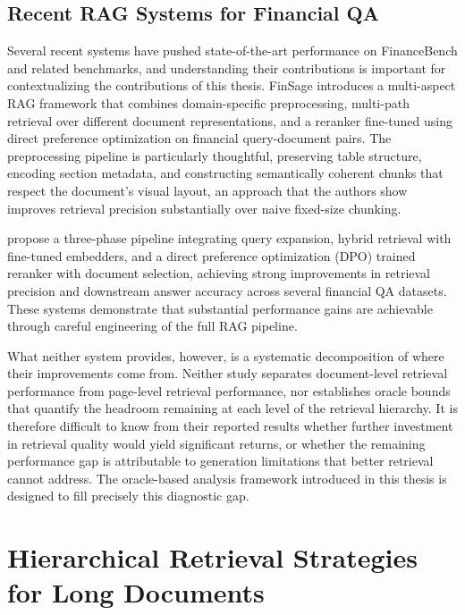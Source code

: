 \documentclass[12pt,twoside,maitrise]{dms}
\theoremstyle{definition}
\numberwithin{equation}{section}
\numberwithin{table}{chapter}
\numberwithin{figure}{chapter}
\begin{document}
\subsection{Recent RAG Systems for Financial QA}

Several recent systems have pushed state-of-the-art performance on FinanceBench and
related benchmarks, and understanding their contributions is important for contextualizing
the contributions of this thesis. FinSage \citep{wang2024finsage} introduces a
multi-aspect RAG framework that combines domain-specific preprocessing, multi-path
retrieval over different document representations, and a reranker fine-tuned using direct
preference optimization on financial query-document pairs. The preprocessing pipeline is
particularly thoughtful, preserving table structure, encoding section metadata, and
constructing semantically coherent chunks that respect the document's visual layout, an
approach that the authors show improves retrieval precision substantially over naive
fixed-size chunking.

\citet{kim2024optimizing} propose a three-phase pipeline integrating query
expansion, hybrid retrieval with fine-tuned embedders, and a direct preference optimization (DPO) trained reranker with
document selection, achieving strong improvements in retrieval precision and downstream
answer accuracy across several financial QA datasets. These systems demonstrate that
substantial performance gains are achievable through careful engineering of the full RAG
pipeline.

What neither system provides, however, is a systematic decomposition of where their
improvements come from. Neither study separates document-level retrieval performance
from page-level retrieval performance, nor establishes oracle bounds that quantify the
headroom remaining at each level of the retrieval hierarchy. It is therefore difficult
to know from their reported results whether further investment in retrieval quality would
yield significant returns, or whether the remaining performance gap is attributable to
generation limitations that better retrieval cannot address. The oracle-based analysis
framework introduced in this thesis is designed to fill precisely this diagnostic gap.


\section{Hierarchical Retrieval Strategies for Long Documents}
\label{sec:hierarchical_retrieval}
\end{document}
